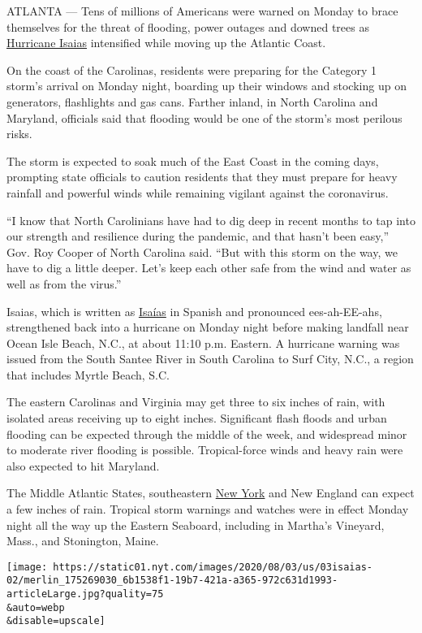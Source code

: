 ATLANTA --- Tens of millions of Americans were warned on Monday to brace
themselves for the threat of flooding, power outages and downed trees as
\href{https://www.nytimes.com/2020/08/04/us/isaias-storm-updates.html}{Hurricane
Isaias} intensified while moving up the Atlantic Coast.

On the coast of the Carolinas, residents were preparing for the Category
1 storm's arrival on Monday night, boarding up their windows and
stocking up on generators, flashlights and gas cans. Farther inland, in
North Carolina and Maryland, officials said that flooding would be one
of the storm's most perilous risks.

The storm is expected to soak much of the East Coast in the coming days,
prompting state officials to caution residents that they must prepare
for heavy rainfall and powerful winds while remaining vigilant against
the coronavirus.

``I know that North Carolinians have had to dig deep in recent months to
tap into our strength and resilience during the pandemic, and that
hasn't been easy,'' Gov. Roy Cooper of North Carolina said. ``But with
this storm on the way, we have to dig a little deeper. Let's keep each
other safe from the wind and water as well as from the virus.''

Isaias, which is written as
\href{https://www.nytimes.com/2020/08/04/nyregion/isaias-tropical-storm-nyc.html}{Isaías}
in Spanish and pronounced ees-ah-EE-ahs, strengthened back into a
hurricane on Monday night before making landfall near Ocean Isle Beach,
N.C., at about 11:10 p.m. Eastern. A hurricane warning was issued from
the South Santee River in South Carolina to Surf City, N.C., a region
that includes Myrtle Beach, S.C.

The eastern Carolinas and Virginia may get three to six inches of rain,
with isolated areas receiving up to eight inches. Significant flash
floods and urban flooding can be expected through the middle of the
week, and widespread minor to moderate river flooding is possible.
Tropical-force winds and heavy rain were also expected to hit Maryland.

The Middle Atlantic States, southeastern
\href{https://www.nytimes.com/2020/08/04/nyregion/isaias-tropical-storm-nyc.html}{New
York} and New England can expect a few inches of rain. Tropical storm
warnings and watches were in effect Monday night all the way up the
Eastern Seaboard, including in Martha's Vineyard, Mass., and Stonington,
Maine.

\texttt{[image: https://static01.nyt.com/images/2020/08/03/us/03isaias-02/merlin\_175269030\_6b1538f1-19b7-421a-a365-972c631d1993-articleLarge.jpg?quality=75\\\&auto=webp\\\&disable=upscale]}


